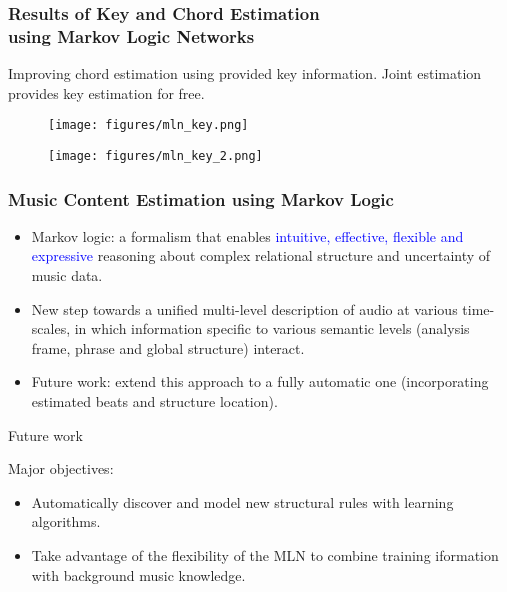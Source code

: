 \documentclass[12pt]{beamer}
\begin{document}
\begin{frame} 
\frametitle{Results of Key and Chord Estimation \\ using Markov Logic Networks}
Improving chord estimation using provided key information. Joint
estimation provides key estimation for free.

\begin{figure}[htb]
   \centering
   \texttt{[image: figures/mln\_key.png]}
\end{figure}

\begin{figure}[htb]
   \centering
   \texttt{[image: figures/mln\_key\_2.png]}
\end{figure}



\end{frame} 


\begin{frame}
\frametitle{Music Content Estimation using Markov Logic}


\begin{itemize}
\item Markov logic: a formalism that enables \textcolor{blue}{intuitive, effective, flexible and expressive} reasoning about complex relational structure and uncertainty of music data. 
\medskip

\item New step towards a unified multi-level description of audio at various time-scales, in which information specific to various semantic levels (analysis frame, phrase and global structure) interact.


\item Future work: extend this approach to a fully automatic one (incorporating estimated beats and structure location).

\end{itemize}
\end{frame} 


\begin{frame}{Future work}

Major objectives: 

\begin{itemize}
	\item Automatically discover and model new structural rules with learning algorithms.
	\item Take advantage of the flexibility of the MLN to combine training iformation with background music knowledge.
\end{itemize}
\end{frame}
\end{document}
